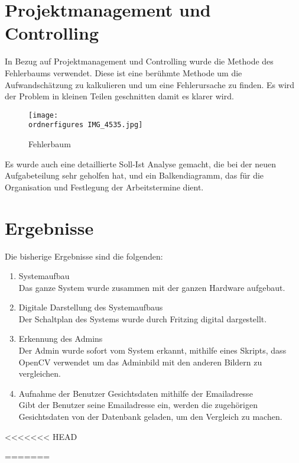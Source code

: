 	\section{Projektmanagement und Controlling}
	In Bezug auf Projektmanagement und Controlling wurde die Methode des Fehlerbaums verwendet. Diese ist eine ber{\"u}hmte Methode um die Aufwandsch{\"a}tzung zu kalkulieren und um eine Fehlerursache zu finden. Es wird der Problem in kleinen Teilen geschnitten damit es klarer wird. 
	\begin{figure}		\texttt{[image: \\ordnerfigures IMG\_4535.jpg]}
		\caption{Fehlerbaum}
	\end{figure}
	Es wurde auch eine detaillierte Soll-Ist Analyse gemacht, die bei der neuen Aufgabeteilung sehr geholfen hat, und ein Balkendiagramm, das f{\"u}r die Organisation und Festlegung der Arbeitstermine dient.
	\section{Ergebnisse}
	Die bisherige Ergebnisse sind die folgenden:\\
	\begin{enumerate}
		\item Systemaufbau \\
		Das ganze System wurde zusammen mit der ganzen Hardware aufgebaut.
		\item Digitale Darstellung des Systemaufbaus\\
		Der Schaltplan des Systems wurde durch Fritzing digital dargestellt.
		\item Erkennung des Admins \\
		Der Admin wurde sofort vom System erkannt, mithilfe eines Skripts, dass OpenCV verwendet um das Adminbild mit den anderen Bildern zu vergleichen.
		\item Aufnahme der Benutzer Gesichtsdaten mithilfe der Emailadresse\\
		Gibt der Benutzer seine Emailadresse ein, werden die zugehörigen Gesichtsdaten von der Datenbank geladen, um den Vergleich zu machen.
	\end{enumerate}
<<<<<<< HEAD
	
	
=======


